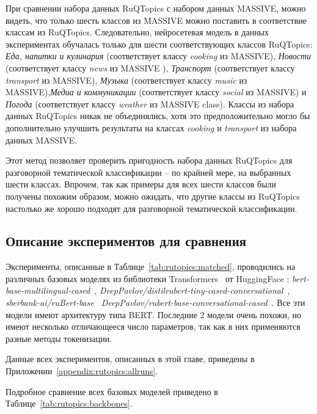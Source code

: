 При сравнении набора данных {RuQTopics} с набором данных {MASSIVE}, можно видеть, что только шесть классов из {MASSIVE} можно поставить в соответствие классам из  {RuQTopics}. Следовательно, нейросетевая модель в данных экспериментах обучалась только для шести соответствующих классов {RuQTopics}: \textit{Еда, напитки и кулинария} (соответствует классу \textit{cooking} из {MASSIVE}), \textit{Новости} (соответствует классу \textit{news} из {MASSIVE} ), \textit{Транспорт} (соответствует классу \textit{transport} из {MASSIVE}), \textit{Музыка} (соответствует классу \textit{music} из {MASSIVE}),\textit{Медиа и коммуникации} (соответствует классу \textit{social} из {MASSIVE}) и \textit{Погода} (соответствует классу \textit{weather} из {MASSIVE} class). Классы из набора данных {RuQTopics} никак не объединялись, хотя это предположительно могло бы дополнительно улучшить результаты на классах \textit{cooking} и \textit{transport} из набора данных {MASSIVE}.

Этот метод позволяет проверить пригодность набора данных {RuQTopics} для разговорной тематической классификации -- по крайней мере, на выбранных шести классах. Впрочем, так как примеры для всех шести классов были получены похожим образом, можно ожидать, что другие классы из {RuQTopics} настолько же хорошо подходят для разговорной тематической классификации.

\subsection{Описание экспериментов для сравнения}
Эксперименты, описанные в Таблице~\ref{tab:rutopics:matched}, проводились на различных базовых моделях из библиотеки {Transformers}~\cite{huggingface_transformers} от HuggingFace : \textit{bert-base-multilingual-cased}~\cite{multilingual_bert}, \textit{DeepPavlov/distilrubert-tiny-cased-conversational}~\cite{distilrubert}, \textit{sberbank-ai/ruBert-base}~\cite{sbert_base}  \textit{DeepPavlov/rubert-base-conversational-cased}~\cite{rubert}. Все эти модели имеют архитектуру типа BERT. Последние 2 модели очень похожи, но имеют несколько отличающееся число параметров, так как в них применяются разные методы токенизации.

Данные всех экспериментов, описанных в этой главе, приведены в Приложении~\ref{appendix:rutopics:allruns}. 

Подробное сравнение всех базовых моделей приведено в Таблице~\ref{tab:rutopics:backbones}.


